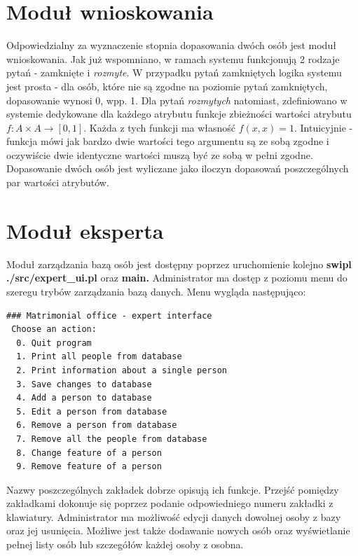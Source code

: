 \documentclass[12pt]{article}
\begin{document}
\section{Moduł wnioskowania}
Odpowiedzialny za wyznaczenie stopnia dopasowania dwóch osób jest moduł wnioskowania. Jak już wspomniano, w ramach systemu funkcjonują 2 rodzaje pytań - zamknięte i \textit{rozmyte}. W przypadku pytań zamkniętych logika systemu jest prosta - dla osób, które nie są zgodne na poziomie pytań zamkniętych, dopasowanie wynosi 0, wpp. 1. Dla pytań \textit{rozmytych} natomiast, zdefiniowano w systemie dedykowane dla każdego atrybutu funkcje zbieżności wartości atrybutu $f: A \times A \rightarrow [0, 1]$. Każda z tych funkcji ma własność $f(x, x)=1$. Intuicyjnie - funkcja mówi jak bardzo dwie wartości tego argumentu są ze sobą zgodne i oczywiście dwie identyczne wartości muszą być ze sobą w pełni zgodne. Dopasowanie dwóch osób jest wyliczane jako iloczyn dopasowań poszczególnych par wartości atrybutów.
\section{Moduł eksperta}
Moduł zarządzania bazą osób jest dostępny poprzez uruchomienie kolejno \textbf{swipl ./src/expert\_ui.pl} oraz \textbf{main.}
Administrator ma dostęp z poziomu menu do szeregu trybów zarządzania bazą danych. Menu wygląda następująco:
\begin{verbatim}
### Matrimonial office - expert interface
 Choose an action:
  0. Quit program
  1. Print all people from database
  2. Print information about a single person
  3. Save changes to database
  4. Add a person to database
  5. Edit a person from database
  6. Remove a person from database
  7. Remove all the people from database
  8. Change feature of a person
  9. Remove feature of a person
\end{verbatim}
Nazwy poszczególnych zakładek dobrze opisują ich funkcje. Przejść pomiędzy zakładkami dokonuje się poprzez podanie odpowiedniego numeru zakładki z klawiatury. Administrator ma możliwość edycji danych dowolnej osoby z bazy oraz jej usunięcia. Możliwe jest także dodawanie nowych osób oraz wyświetlanie pełnej listy osób lub szczegółów każdej osoby z osobna.
\end{document}
